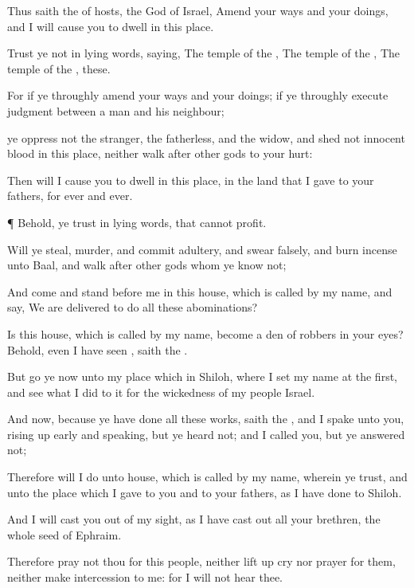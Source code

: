 {Thus
saith the
{} of
hosts, the
God of
Israel,
Amend your
ways and your
doings, and I will cause you to
dwell in this
place.

Trust ye not in
lying
words,
saying, The
temple of the
{}, The
temple of the
{}, The
temple of the
{},
{} these.

For if ye
throughly
amend your
ways and your
doings; if ye
throughly
execute
judgment between a
man and his
neighbour;

 ye
oppress not the
stranger, the
fatherless, and the
widow, and
shed not
innocent
blood in this
place, neither
walk
after
other
gods to your
hurt:

Then will I cause you to
dwell in this
place, in the
land that I
gave to your
fathers,
for
ever and
ever.


\par }{\PP {}¶ Behold, ye
trust in
lying
words, that cannot
profit.

Will ye
steal,
murder, and commit
adultery, and
swear
falsely, and burn
incense unto
Baal, and
walk
after
other
gods whom ye
know not;

And
come and
stand
before me in this
house, which is
called by my
name, and
say, We are
delivered to
do all these
abominations?

Is this
house, which is
called by my
name, become a
den of
robbers in your
eyes? Behold, even I have
seen
{},
saith the
{}.

But
go ye now unto my
place which
{} in
Shiloh, where I
set my
name at the
first, and
see what I
did to it
for the
wickedness of my
people
Israel.

And now, because ye have
done all these
works,
saith the
{}, and I
spake unto you, rising up
early and
speaking, but ye
heard not; and I
called you, but ye
answered not;

Therefore will I
do unto
{}
house, which is
called by my
name, wherein ye
trust, and unto the
place which I
gave to you and to your
fathers, as I have
done to
Shiloh.

And I will cast you
out of my
sight, as I have cast
out all your
brethren,
{} the whole
seed of
Ephraim.


\par }{\PP {}Therefore
pray not thou for this
people, neither lift
up
cry nor
prayer for
them, neither make
intercession to me: for I will not
hear thee.


}
